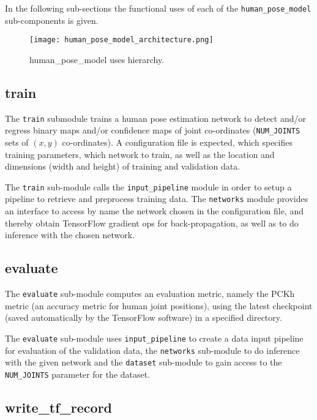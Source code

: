 \documentclass{scrreprt}
\begin{document}
In the following sub-sections the functional uses of each of the
\verb|human_pose_model| sub-components is given.

\begin{figure}[!ht]
        \centering
        \caption{human\_pose\_model uses hierarchy.}
        \texttt{[image: human\_pose\_model\_architecture.png]}
        \label{human_pose_model_arch}
\end{figure}

\subsection{train}

The \verb|train| submodule trains a human pose estimation network to detect
and/or regress binary maps and/or confidence maps of joint co-ordinates
(\verb|NUM_JOINTS| sets of $(x, y)$ co-ordinates). A configuration file is
expected, which specifies training parameters, which network to train, as well
as the location and dimensions (width and height) of training and validation
data.

The \verb|train| sub-module calls the \verb|input_pipeline| module in order to
setup a pipeline to retrieve and preprocess training data. The \verb|networks|
module provides an interface to access by name the network chosen in the
configuration file, and thereby obtain TensorFlow gradient ops for
back-propagation, as well as to do inference with the chosen network.

\subsection{evaluate}

The \verb|evaluate| sub-module computes an evaluation metric, namely the PCKh
metric (an accuracy metric for human joint positions), using the latest
checkpoint (saved automatically by the TensorFlow software) in a specified
directory.

The \verb|evaluate| sub-module uses \verb|input_pipeline| to create a data
input pipeline for evaluation of the validation data, the \verb|networks|
sub-module to do inference with the given network and the \verb|dataset|
sub-module to gain access to the \verb|NUM_JOINTS| parameter for the dataset.

\subsection{write\_tf\_record}
\end{document}
